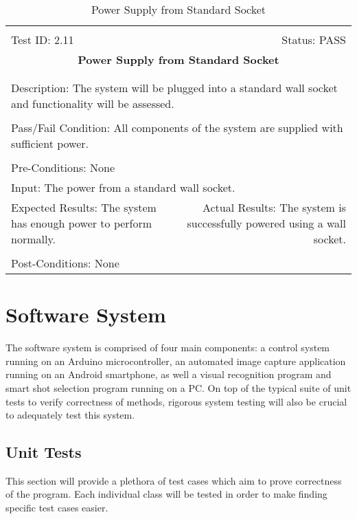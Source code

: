 \documentclass[titlepage]{article}
\begin{document}
\begin{center}
\begin{table}[h!]
\begin{tabular}{|l r|}\hline&\\[-2mm]
	Test ID: 2.11	&Status: PASS\\[-3mm]
	\multicolumn{2}{|c|}{\textbf{\large{Power Supply from Standard Socket}}}\\&\\\hline&\\[-3mm]
	\multicolumn{2}{|p{\textwidth}|}{Description: The system will be plugged into a standard wall socket and functionality will be assessed.}\\[1mm]\hline&\\[-3mm]
	\multicolumn{2}{|p{\textwidth}|}{Pass/Fail Condition: All components of the system are supplied with sufficient power.}\\[1mm]\hline&\\[-3mm]
	\multicolumn{2}{|p{\textwidth}|}{Pre-Conditions: None}\\[4mm]
	\multicolumn{2}{|p{\textwidth}|}{Input: The power from a standard wall socket.}\\[2mm]\hline
	\multicolumn{1}{|p{0.49\textwidth}}{Expected Results: The system has enough power to perform normally.}	&\multicolumn{1}{|p{0.45\textwidth}|}{Actual Results: The system is successfully powered using a wall socket.}\\\hline&\\[-3mm]
	\multicolumn{2}{|p{\textwidth}|}{Post-Conditions: None}\\\hline
\end{tabular}
\caption{Power Supply from Standard Socket}
\end{table}
\end{center}
\newpage


\section{Software System}
The software system is comprised of four main components: a control system running on an Arduino microcontroller, an automated image capture application running on an Android smartphone, as well a visual recognition program and smart shot selection program running on a PC. On top of the typical suite of unit tests to verify correctness of methods, rigorous system testing will also be crucial to adequately test this system.

\subsection{Unit Tests}
This section will provide a plethora of test cases which aim to prove correctness of the program. Each individual class will be tested in order to make finding specific test cases easier.
\newpage
\end{document}
